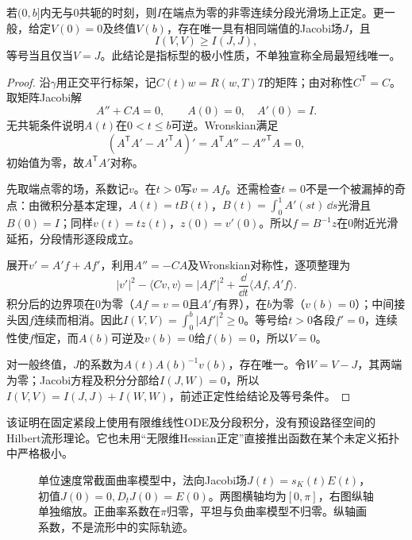 \begin{theorem}[无共轭时的指标引理]\label{thm:index-lemma}
若$(0,b]$内无与0共轭的时刻，则$I$在端点为零的非零连续分段光滑场上正定。更一般，给定$V(0)=0$及终值$V(b)$，存在唯一具有相同端值的Jacobi场$J$，且
\[
 I(V,V)\geq I(J,J),
\]
等号当且仅当$V=J$。此结论是指标型的极小性质，不单独宣称全局最短线唯一。
\end{theorem}
\begin{proof}
沿$\gamma$用正交平行标架，记$C(t)w=R(w,T)T$的矩阵；由对称性$C^{\mathsf T}=C$。取矩阵Jacobi解
\[
 A''+CA=0,\qquad A(0)=0,\quad A'(0)=I.
\]
无共轭条件说明$A(t)$在$0<t\leq b$可逆。Wronskian满足
\[
 (A^{\mathsf T}A'-A'^{\mathsf T}A)'
 =A^{\mathsf T}A''-A''^{\mathsf T}A=0,
\]
初始值为零，故$A^{\mathsf T}A'$对称。

先取端点零的场，系数记$v$。在$t>0$写$v=Af$。还需检查$t=0$不是一个被漏掉的奇点：由微积分基本定理，$A(t)=tB(t)$，$B(t)=\int_0^1A'(st)\,\dd s$光滑且$B(0)=I$；同样$v(t)=tz(t)$，$z(0)=v'(0)$。所以$f=B^{-1}z$在0附近光滑延拓，分段情形逐段成立。

展开$v'=A'f+Af'$，利用$A''=-CA$及Wronskian对称性，逐项整理为
\[
 |v'|^2-\langle Cv,v\rangle
 =|Af'|^2+\frac{\dd}{\dd t}\langle Af,A'f\rangle.
\]
积分后的边界项在0为零（$Af=v=0$且$A'f$有界），在$b$为零（$v(b)=0$）；中间接头因$f$连续而相消。因此$I(V,V)=\int_0^b|Af'|^2\geq0$。等号给$t>0$各段$f'=0$，连续性使$f$恒定，而$A(b)$可逆及$v(b)=0$给$f(b)=0$，所以$V=0$。

对一般终值，$J$的系数为$A(t)A(b)^{-1}v(b)$，存在唯一。令$W=V-J$，其两端为零；Jacobi方程及积分分部给$I(J,W)=0$，所以$I(V,V)=I(J,J)+I(W,W)$，前述正定性给结论及等号条件。
\end{proof}

该证明在固定紧段上使用有限维线性ODE及分段积分，没有预设路径空间的Hilbert流形理论。它也未用“无限维Hessian正定”直接推出函数在某个未定义拓扑中严格极小。

\begin{figure}[htbp]
\centering
\caption{单位速度常截面曲率模型中，法向Jacobi场$J(t)=s_K(t)E(t)$，初值$J(0)=0,D_tJ(0)=E(0)$。两图横轴均为$[0,\pi]$，右图纵轴单独缩放。正曲率系数在$\pi$归零，平坦与负曲率模型不归零。纵轴画系数，不是流形中的实际轨迹。}
\label{fig:jacobi-models}
\end{figure}

